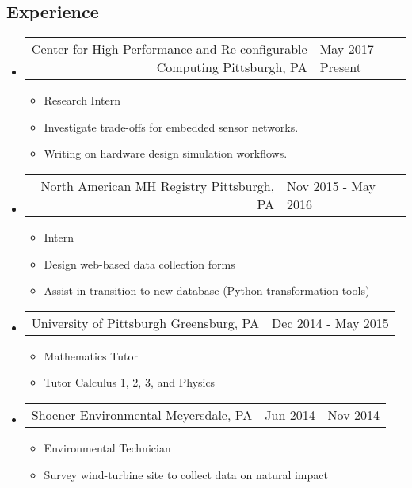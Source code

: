 \documentclass[18pt]{article}
\makeatletter
\providecommand{\tightlist}{
    \setlength{\itemsep}{0pt}\setlength{\parskip}{0pt}
}
\providecommand{\datetable}[2]{
    \begin{tabular*}{\textwidth}{r @{\extracolsep{\fill}} l}
        #1 & #2
    \end{tabular*}
}
\makeatother
\begin{document}
    \subsection*{Experience}\label{experience}
      \begin{itemize}\tightlist
        
        \item
        \datetable
            {Center for High-Performance and Re-configurable Computing \textbar{} Pittsburgh, PA}
            {May 2017 - Present}
        \begin{itemize}\tightlist
          \item Research Intern
          \item Investigate trade-offs for embedded sensor networks.
          \item Writing on hardware design simulation workflows.
      	\end{itemize}
        
        \item
        \datetable
            {North American MH Registry \textbar{} Pittsburgh, PA}
            {Nov 2015 - May 2016}
        \begin{itemize}\tightlist
          \item Intern
          \item Design web-based data collection forms
          \item Assist in transition to new database (Python transformation tools)
        \end{itemize}

        \item \datetable
            {University of Pittsburgh \textbar{} Greensburg, PA}
            {Dec 2014 - May 2015}
        \begin{itemize}\tightlist
          \item Mathematics Tutor
          \item Tutor Calculus 1, 2, 3, and Physics
        \end{itemize}
        
        \item \datetable 
            {Shoener Environmental \textbar{} Meyersdale, PA}
            {Jun 2014 - Nov 2014}
        \begin{itemize}\tightlist
          \item Environmental Technician
          \item Survey wind-turbine site to collect data on natural impact
        \end{itemize}

      \end{itemize} %
\end{document}
